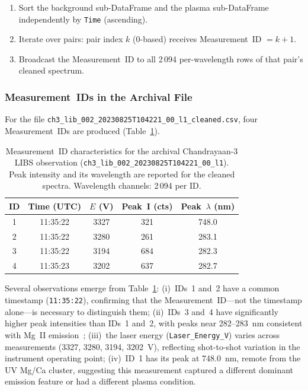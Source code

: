 \documentclass[a4paper,twocolumn,10pt]{article}
\begin{document}
\begin{enumerate}[nosep,leftmargin=*]
  \item Sort the background sub-DataFrame and the plasma
    sub-DataFrame independently by \texttt{Time} (ascending).
  \item Iterate over pairs: pair index $k$ (0-based) receives
    Measurement~ID $= k + 1$.
  \item Broadcast the Measurement~ID to all 2\,094
    per-wavelength rows of that pair's cleaned spectrum.
\end{enumerate}

\subsubsection{Measurement~IDs in the Archival File}

For the file \texttt{ch3\_lib\_002\_20230825T104221\_00\_l1\_cleaned.csv},
four Measurement~IDs are produced (Table~\ref{tab:measurement_ids}).

\begin{table}[htbp]
\centering
\caption{Measurement~ID characteristics for the archival
  Chandrayaan-3 LIBS observation
  (\texttt{ch3\_lib\_002\_20230825T104221\_00\_l1}).
  Peak intensity and its wavelength are reported for the cleaned
  spectra.  Wavelength channels: 2\,094 per ID.}
\label{tab:measurement_ids}
\begin{tabularx}{\columnwidth}{c c c c c}
\toprule
\textbf{ID} & \textbf{Time (UTC)} & \textbf{$E$ (V)} & \textbf{Peak~I (cts)} & \textbf{Peak~$\lambda$ (nm)} \\
\midrule
1 & 11:35:22 & 3327 & 321  & 748.0 \\
2 & 11:35:22 & 3280 & 261  & 283.1 \\
3 & 11:35:22 & 3194 & 684  & 282.3 \\
4 & 11:35:23 & 3202 & 637  & 282.7 \\
\bottomrule
\end{tabularx}
\end{table}

Several observations emerge from Table~\ref{tab:measurement_ids}:
(i)~IDs~1 and~2 have a common timestamp (\texttt{11:35:22}),
confirming that the Measurement~ID---not the timestamp alone---is
necessary to distinguish them; (ii)~IDs~3 and~4 have significantly
higher peak intensities than IDs~1 and~2, with peaks near 282--283~nm
consistent with Mg~II emission~\cite{NIST}; (iii)~the laser energy
(\texttt{Laser\_Energy\_V}) varies across measurements (3327, 3280,
3194, 3202~V), reflecting shot-to-shot variation in the instrument
operating point; (iv)~ID~1 has its peak at 748.0~nm, remote from the
UV Mg/Ca cluster, suggesting this measurement captured a different
dominant emission feature or had a different plasma condition.
\end{document}
